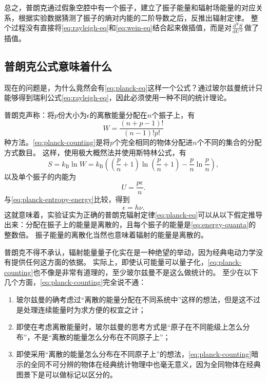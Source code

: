\documentclass[UTF8, a4paper]{ctexart}
\begin{document}
总之，普朗克通过假象空腔中有一个振子，建立了振子能量和辐射场能量的对应关系，根据实验数据猜测了振子的熵对内能的二阶导数之后，反推出辐射定律。
整个过程没有直接将\eqref{eq:rayleigh-eq}和\eqref{eq:wein-eq}结合起来做插值，而是对$\dv[2]{S}{U}$做了插值。

\subsection{普朗克公式意味着什么}

现在的问题是，为什么竟然会有\eqref{eq:planck-eq}这样一个公式？通过玻尔兹曼统计只能够得到瑞利公式\eqref{eq:rayleigh-eq}，因此必须使用一种不同的统计理论。

普朗克声称：将$p$份大小为$\epsilon$的离散能量分配在$n$个振子上，有
\begin{equation}
    W = \frac{(n+p-1)!}{(n-1)!p!}
    \label{eq:planck-counting}
\end{equation}
种方法。\eqref{eq:planck-counting}是将$p$个完全相同的物体分配进$n$个不同的集合的分配方式数目。
这样，使用极大概然法并使用斯特林公式，有
\[
    S = k_\text{B} \ln W = k_\text{B} \left( \left(\frac{p}{n} + 1\right) \ln \left(\frac{p}{n} + 1 \right) - \frac{p}{n} \ln \frac{p}{n} \right),
\]
以及单个振子的内能为
\[
    U = \frac{p \epsilon}{n}.
\]
与\eqref{eq:planck-entropy-energy}比较，得到
\begin{equation}
    \epsilon = h \nu.
    \label{eq:energy-quanta}
\end{equation}
这就意味着，实验证实为正确的普朗克辐射定律\eqref{eq:planck-eq}可以从以下假定推导出来：分配在振子上的能量是离散的，且每个振子的能量是\eqref{eq:energy-quanta}的整数倍。
振子能量的离散化当然也意味着辐射的能量是离散的。

普朗克不得不承认，辐射能量量子化实在是一种绝望的举动，因为经典电动力学没有提供任何这方面的依据。
实际上，即使认可能量可以量子化，\eqref{eq:planck-counting}也不像是非常有道理的，至少玻尔兹曼不是这么做统计的。
至少在以下几个方面，\eqref{eq:planck-counting}完全说不通：
\begin{enumerate}
    \item 玻尔兹曼的确考虑过“离散的能量分配在不同系统中”这样的想法，但是这不过是处理连续能量时为求方便的权宜之计；
    \item 即使在考虑离散能量时，玻尔兹曼的思考方式是“原子在不同能级上怎么分布”，不是“离散的能量怎么分布在不同原子上”；
    \item 即使采用“离散的能量怎么分布在不同原子上”的想法，\eqref{eq:planck-counting}暗示的全同不可分辨的物体在经典统计物理中也毫无意义，因为全同物体在经典图景下是可以做标记以区分的。
\end{enumerate}
\end{document}
